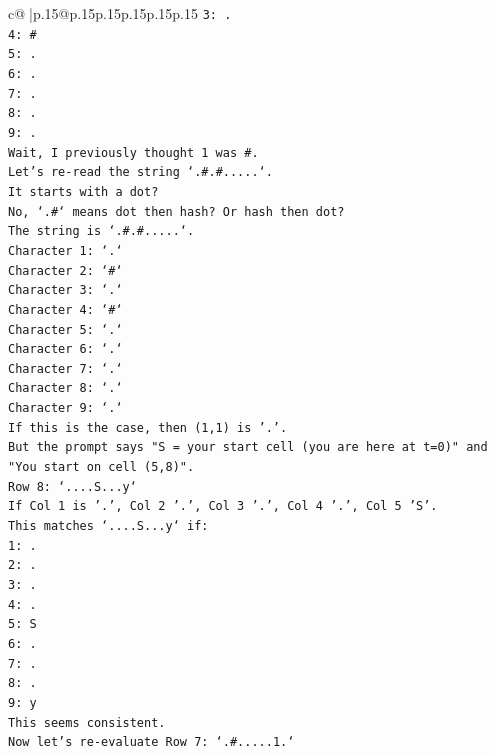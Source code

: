 \documentclass{article}
\begin{document}
{\begin{supertabular}{c@{$\;$}|p{.15\linewidth}@{}p{.15\linewidth}p{.15\linewidth}p{.15\linewidth}p{.15\linewidth}p{.15\linewidth}}
{{{\texttt{3: .} \\
\texttt{4: \#} \\
\texttt{5: .} \\
\texttt{6: .} \\
\texttt{7: .} \\
\texttt{8: .} \\
\texttt{9: .} \\
\texttt{Wait, I previously thought 1 was \#.} \\
\texttt{Let's re{-}read the string `.\#.\#.....`.} \\
\texttt{It starts with a dot?} \\
\texttt{No, `.\#` means dot then hash? Or hash then dot?} \\
\texttt{The string is `.\#.\#.....`.} \\
\texttt{Character 1: `.`} \\
\texttt{Character 2: `\#`} \\
\texttt{Character 3: `.`} \\
\texttt{Character 4: `\#`} \\
\texttt{Character 5: `.`} \\
\texttt{Character 6: `.`} \\
\texttt{Character 7: `.`} \\
\texttt{Character 8: `.`} \\
\texttt{Character 9: `.`} \\
\texttt{If this is the case, then (1,1) is '.'.} \\
\texttt{But the prompt says "S = your start cell (you are here at t=0)" and "You start on cell (5,8)".} \\
\texttt{Row 8: `....S...y`} \\
\texttt{If Col 1 is '.', Col 2 '.', Col 3 '.', Col 4 '.', Col 5 'S'.} \\
\texttt{This matches `....S...y` if:} \\
\texttt{1: .} \\
\texttt{2: .} \\
\texttt{3: .} \\
\texttt{4: .} \\
\texttt{5: S} \\
\texttt{6: .} \\
\texttt{7: .} \\
\texttt{8: .} \\
\texttt{9: y} \\
\texttt{This seems consistent.} \\
\texttt{Now let's re{-}evaluate Row 7: `.\#.....1.`} \\
}}}
\end{supertabular}}
\end{document}
